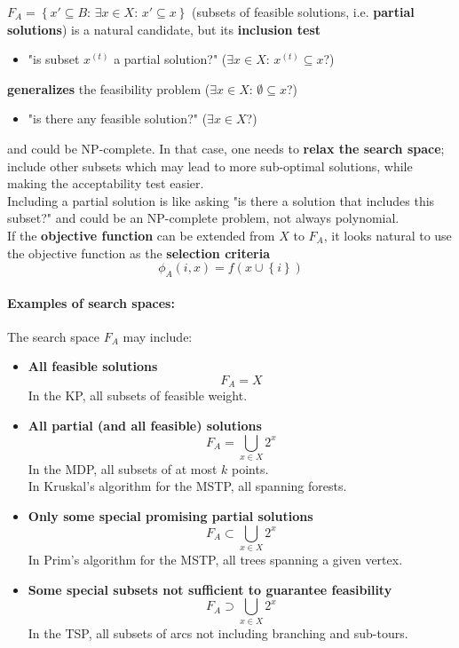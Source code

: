 \documentclass[11pt]{article}
\begin{document}
	$F_A = \left\{x' \subseteq B : \, \exists x \in X : \, x' \subseteq x\right\}$ (subsets of feasible solutions, i.e. \textbf{partial solutions}) is a natural candidate, but its \textbf{inclusion test}
	\begin{itemize}[label*=]
		\item "is subset $x^{(t)}$ a partial solution?" ($\exists x \in X : \, x^{(t)} \subseteq x$?)
	\end{itemize}
	\textbf{generalizes} the feasibility problem ($\exists x \in X : \, \emptyset \subseteq x$?)
	\begin{itemize}[label*=]
		\item "is there any feasible solution?" ($\exists x \in X$?)
	\end{itemize}
	and could be NP-complete. In that case, one needs to \textbf{relax the search space}; include other subsets which may lead to more sub-optimal solutions, while making the acceptability test easier.\\
	
	Including a partial solution is like asking "is there a solution that includes this subset?" and could be an NP-complete problem, not always polynomial.\\
	
	If the \textbf{objective function} can be extended from $X$ to $F_A$, it looks natural to use the objective function as the \textbf{selection criteria}
	$$ \phi_A (i,x) = f \left(x \cup \left\{i\right\} \right)$$
	
	\newpage
	
	\paragraph{Examples of search spaces:} The search space $F_A$ may include:
	\begin{itemize}
		\item \textbf{All feasible solutions}
		$$ F_A = X $$
		In the KP, all subsets of feasible weight.\\
		
		\item \textbf{All partial (and all feasible) solutions}
		$$ F_A = \bigcup_{x \in X} 2^x $$
		In the MDP, all subsets of at most $k$ points.\\
		In Kruskal's algorithm for the MSTP, all spanning forests.\\
		
		\item \textbf{Only some special promising partial solutions}
		$$ F_A \subset \bigcup_{x \in X} 2^x $$
		In Prim's algorithm for the MSTP, all trees spanning a given vertex.\\
		
		\item \textbf{Some special subsets not sufficient to guarantee feasibility}
		$$ F_A \supset \bigcup_{x \in X} 2^x $$
		In the TSP, all subsets of arcs not including branching and sub-tours.\\
	\end{itemize}
	
\end{document}
